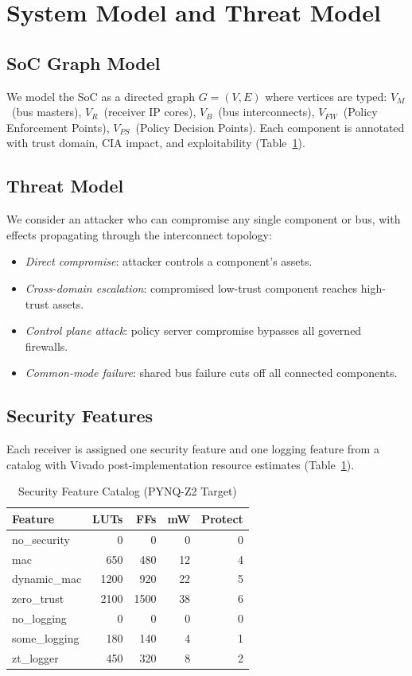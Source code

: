 \documentclass[conference]{IEEEtran}
\begin{document}
\section{System Model and Threat Model}

\subsection{SoC Graph Model}
We model the SoC as a directed graph $G=(V,E)$ where vertices are typed:
$V_M$~(bus masters), $V_R$~(receiver IP cores), $V_B$~(bus
interconnects), $V_{FW}$~(Policy Enforcement Points), $V_{PS}$~(Policy
Decision Points). Each component is annotated with trust domain, CIA impact,
and exploitability (Table~\ref{tab:features}).

\subsection{Threat Model}
We consider an attacker who can compromise any single component or bus,
with effects propagating through the interconnect topology:
\begin{itemize}
\item \textit{Direct compromise}: attacker controls a component's assets.
\item \textit{Cross-domain escalation}: compromised low-trust component
  reaches high-trust assets.
\item \textit{Control plane attack}: policy server compromise bypasses all
  governed firewalls.
\item \textit{Common-mode failure}: shared bus failure cuts off all
  connected components.
\end{itemize}

\subsection{Security Features}
Each receiver is assigned one security feature and one logging feature from
a catalog with Vivado post-implementation resource estimates
(Table~\ref{tab:features}).

\begin{table}[t]
\caption{Security Feature Catalog (PYNQ-Z2 Target)}
\label{tab:features}
\centering
\scriptsize
\begin{tabular}{lrrrr}
\toprule
Feature & LUTs & FFs & mW & Protect \\
\midrule
no\_security     &    0 &    0 &  0 & 0 \\
mac              &  650 &  480 & 12 & 4 \\
dynamic\_mac     & 1200 &  920 & 22 & 5 \\
zero\_trust      & 2100 & 1500 & 38 & 6 \\
\midrule
no\_logging      &    0 &    0 &  0 & 0 \\
some\_logging    &  180 &  140 &  4 & 1 \\
zt\_logger       &  450 &  320 &  8 & 2 \\
\bottomrule
\end{tabular}
\end{table}
\end{document}
